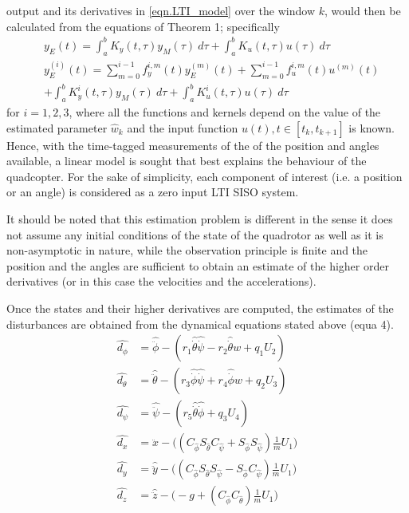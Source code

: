 \documentclass{article}
\begin{document}
output and its derivatives in \eqref{eqn.LTI_model} over the window $k$, would then be calculated  from the equations of Theorem 1; specifically
 \begin{align} \label{eq:evalEST} 
& y_E(t) = \int_a^b K_{y}(t,\tau) y_M(\tau) \ d \tau + \int_a^b K_{u}(t,\tau) u(\tau) \ d \tau \\
& y_E^{(i)}(t) = \sum_{m=0}^{i-1} f_y^{i,m}(t) y_E^{(m)}(t) + \sum_{m=0}^{i-1} f_u^{i,m}(t) u^{(m)}(t) \nonumber \\
& + \int_a^b K_{y}^{i} (t,\tau) y_M(\tau) \ d \tau + \int_a^b K_{u}^{i} (t,\tau) u(\tau) \ d \tau \ 
\end{align}
for $i=1,2,3$, where all the functions and kernels depend on the value of the estimated parameter $\hat{w}_k$ and the input function $u(t), t\in [t_k,t_{k+1}]$ is known. \\[-3mm]




Hence, with the time-tagged measurements of the of the position and angles available, a linear model is sought that best explains the behaviour of the quadcopter. For the sake of simplicity, each component of interest (i.e. a position or an angle) is considered as a zero input LTI SISO system.

It should be noted that this estimation problem is different in the sense it does not assume any initial conditions of the state of the quadrotor as well as it is non-asymptotic in nature, while the observation principle is finite and the position and the angles are sufficient to obtain an estimate of the higher order derivatives (or in this case the velocities and the accelerations).



Once the states and their higher derivatives are computed, the estimates of the disturbances are obtained from the dynamical equations stated above (equa 4). 
\begin{equation}
    \begin{aligned}
    \hat{d_\phi}&=\hat{\ddot{\phi}}-(r_1\hat{\dot{\theta}}\hat{\dot{\psi}}-r_2\hat{\dot{\theta}}w+q_1U_2)\\
    \hat{d_\theta}&=\hat{\ddot{\theta}}-(r_3\hat{\dot{\phi}}\hat{\dot{\psi}}+r_4\hat{\dot{\phi}}w+q_2U_3)\\
    \hat{d_\psi}&=\hat{\ddot{\psi}}-(r_5\hat{\dot{\theta}}\hat{\dot{\phi}}+q_3U_4)\\
    \hat{d_x}&=\hat{\ddot{x}}-\Big((C_{\hat{\phi}}S_{\hat{\theta}}C_{\hat{\psi}}+S_{\hat{\phi}}S_{\hat{\psi}})\frac{1}{m}U_1\Big)\\
    \hat{d_y}&=\hat{\ddot{y}}-\Big((C_{\hat{\phi}}S_{\hat{\theta}}S_{\hat{\psi}}-S_{\hat{\phi}}C_{\hat{\psi}})\frac{1}{m}U_1\Big)\\
    \hat{d_z}&=\hat{\ddot{z}}-\Big(-g+(C_{\hat{\phi}}C_{\hat{\theta}})\frac{1}{m}U_1\Big)
    \end{aligned}
\end{equation}
\end{document}
